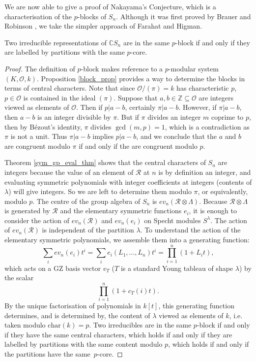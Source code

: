 \documentclass[ALCO,Unicode]{cedram}
\begin{document}
We are now able to give a proof of Nakayama's Conjecture, which is a characterisation of the $p$-blocks of $S_n$. Although it was first proved by Brauer and Robinson \cite{BrauerRobinson}, we take the simpler approach of Farahat and Higman.
\begin{theorem} \label{nakayama_conjecture}
Two irreducible representations of $\mathbb{C}S_n$ are in the same $p$-block if and only if they are labelled by partitions with the same $p$-core.
\end{theorem}
\begin{proof}
The definition of $p$-block makes reference to a $p$-modular system $(K, \mathcal{O}, k)$. Proposition \ref{block_prop} provides a way to determine the blocks in terms of central characters. Note that since $\mathcal{O}/(\pi) = k$ has characteristic $p$, $p \in \mathcal{O}$ is contained in the ideal $(\pi)$. Suppose that $a, b \in \mathbb{Z} \subseteq \mathcal{O}$ are integers viewed as elements of $\mathcal{O}$. Then if $p | a-b$, certainly $\pi | a-b$. However, if $\pi | a-b$, then $a-b$ is an integer divisible by $\pi$. But if $\pi$ divides an integer $m$ coprime to $p$, then by B\'{e}zout's identity, $\pi$ divides $\gcd(m,p)=1$, which is a contradiction as $\pi$ is not a unit. Thus $\pi | a-b$ implies $p | a-b$, and we conclude that the $a$ and $b$ are congruent modulo $\pi$ if and only if the are congruent modulo $p$.

Theorem \ref{sym_gp_eval_thm} shows that the central characters of $S_n$ are integers because the value of an element of $\mathcal{R}$ at $n$ is by definition an integer, and evaluating symmetric polynomials with integer coefficients at integers (contents of $\lambda$) will give integers. So we are left to determine them modulo $\pi$, or equivalently, modulo $p$. The centre of the group algebra of $S_n$ is $ev_n(\mathcal{R} \otimes \Lambda)$. Because $\mathcal{R} \otimes \Lambda$ is generated by $\mathcal{R}$ and the elementary symmetric functions $e_i$, it is enough to consider the action of $ev_n(\mathcal{R})$ and $ev_n(e_i)$ on Specht modules $S^\lambda$. The action of $ev_n(\mathcal{R})$ is independent of the partition $\lambda$. To understand the action of the elementary symmetric polynomials, we assemble them into a generating function:
\[
\sum_i ev_n(e_i) t^i = 
\sum_i e_i(L_1, \ldots, L_n)t^i = \prod_{i=1}^n (1 + L_i t),
\]
which acts on a GZ basis vector $v_T$ ($T$ is a standard Young tableau of shape $\lambda$) by the scalar
\[
\prod_{i=1}^n (1 + c_T(i) t).
\]
By the unique factorisation of polynomials in $k[t]$, this generating function determines, and is determined by, the content of $\lambda$ viewed as elements of $k$, i.e. taken modulo $\mathrm{char}(k)=p$. Two irreducibles are in the same $p$-block if and only if they have the same central characters, which holds if and only if they are labelled by partitions with the same content modulo $p$, which holds if and only if the partitions have the same~$p$-core. 
\end{proof}
\end{document}
